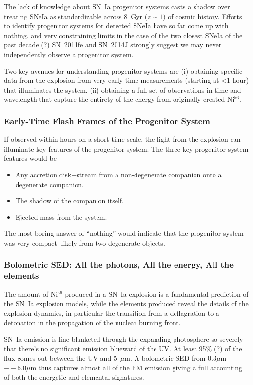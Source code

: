 The lack of knowledge about SN~Ia progenitor systems casts a shadow over treating SNeIa as standardizable across 8~Gyr ($z\sim1$) of cosmic history.  Efforts to identify progenitor systems for detected SNeIa have so far come up with nothing, and very constraining limits in the case of the two closest SNeIa of the past decade (?) SN~2011fe \citep{??} and SN~2014J \citep{??} strongly suggest we may never independently observe a progenitor system.

Two key avenues for understanding progenitor systems are 
(i) obtaining specific data from the explosion from very early-time measurements (starting at <1 hour) that illuminates the system.
(ii) obtaining a full set of observations in time and wavelength that capture the entirety of the energy from originally created Ni$^{56}$.

\subsubsection{Early-Time Flash Frames of the Progenitor System}
If observed within hours on a short time scale, the light from the explosion can illuminate key features of the progenitor system.  The three key progenitor system features would be 
\begin{itemize}
\item Any accretion disk+stream from a non-degenerate companion onto a degenerate companion.
\item The shadow of the companion itself.
\item Ejected mass from the system.
\end{itemize}

The most boring answer of ``nothing'' would indicate that the progenitor system was very compact, likely from two degenerate objects.  

\subsubsection{Bolometric SED: All the photons, All the energy, All the elements}
The amount of Ni$^{56}$ produced in a SN~Ia explosion is a fundamental prediction of the SN~Ia explosion models, while the elements produced reveal the details of the explosion dynamics, in particular the transition from a deflagration to a detonation in the propagation of the nuclear burning front.

SN~Ia emission is line-blanketed through the expanding photosphere so severely that there's no significant emission blueward of the UV.  At least 95\% (?) of the flux comes out between the UV and 5~$\mu$m.  A bolometric SED from $0.3\mu$m$--5.0\mu$m thus captures almost all of the EM emission giving a full accounting of both the energetic and elemental signatures.
